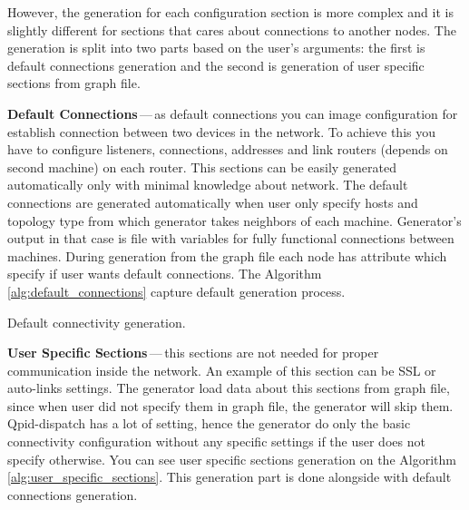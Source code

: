 
However, the generation for each configuration section is more complex and it is slightly different for sections that cares about connections to another nodes. The generation is split into two parts based on the user's arguments: the first is default connections generation and the second is generation of user specific sections from graph file.


\begin{description}
	\item \textbf{Default Connections}\,---\,as default connections you can image configuration for establish connection between two devices in the network. To achieve this you have to configure listeners, connections, addresses and link routers (depends on second machine) on each router. This sections can be easily generated automatically only with minimal knowledge about network. The default connections are generated automatically when user only specify hosts and topology type from which generator takes neighbors of each machine. Generator's output in that case is file with variables for fully functional connections between machines. During generation from the graph file each node has attribute which specify if user wants default connections. The Algorithm \ref{alg:default_connections} capture default generation process.

	\begin{center}
		\begin{algorithm}[H]
			 \caption{Default connectivity generation.}
			 \label{alg:default_connections}
		\end{algorithm}
	\end{center}

	\item \textbf{User Specific Sections}\,---\,this sections are not needed for proper communication inside the network. An example of this section can be SSL or auto-links settings. The generator load data about this sections from graph file, since when user did not specify them in graph file, the generator will skip them. Qpid-dispatch has a lot of setting, hence the generator do only the basic connectivity configuration without any specific settings if the user does not specify otherwise. You can see user specific sections generation on the Algorithm \ref{alg:user_specific_sections}. This generation part is done alongside with default connections generation.


\end{description}
